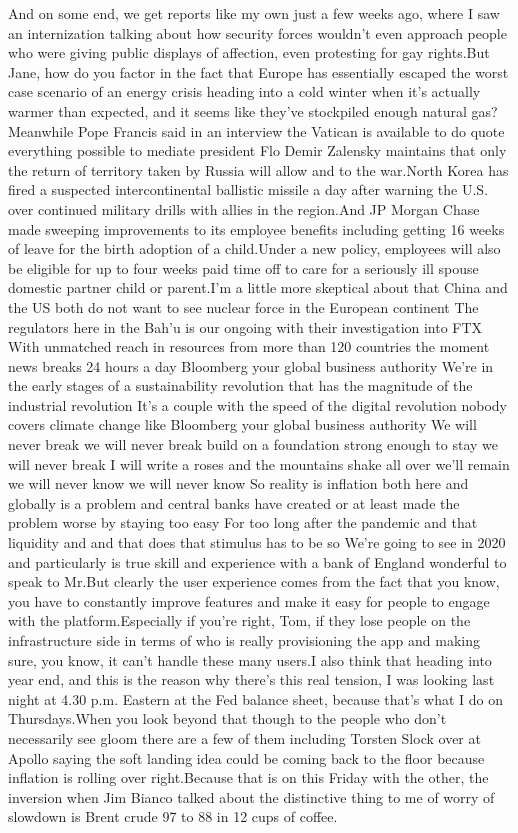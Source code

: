 \documentclass{article}%
\begin{document}
And on some end, we get reports like my own just a few weeks ago, where I saw an internization talking about how security forces wouldn't even approach people who were giving public displays of affection, even protesting for gay rights.But Jane, how do you factor in the fact that Europe has essentially escaped the worst case scenario of an energy crisis heading into a cold winter when it's actually warmer than expected, and it seems like they've stockpiled enough natural gas?Meanwhile Pope Francis said in an interview the Vatican is available to do quote everything possible to mediate president Flo Demir Zalensky maintains that only the return of territory taken by Russia will allow and to the war.North Korea has fired a suspected intercontinental ballistic missile a day after warning the U.S. over continued military drills with allies in the region.And JP Morgan Chase made sweeping improvements to its employee benefits including getting 16 weeks of leave for the birth adoption of a child.Under a new policy, employees will also be eligible for up to four weeks paid time off to care for a seriously ill spouse domestic partner child or parent.I'm a little more skeptical about that China and the US both do not want to see nuclear force in the European continent The regulators here in the Bah'u is our ongoing with their investigation into FTX With unmatched reach in resources from more than 120 countries the moment news breaks 24 hours a day Bloomberg your global business authority We're in the early stages of a sustainability revolution that has the magnitude of the industrial revolution It's a couple with the speed of the digital revolution nobody covers climate change like Bloomberg your global business authority We will never break we will never break build on a foundation strong enough to stay we will never break I will write a roses and the mountains shake all over we'll remain we will never know we will never know So reality is inflation both here and globally is a problem and central banks have created or at least made the problem worse by staying too easy For too long after the pandemic and that liquidity and and that does that stimulus has to be so We're going to see in 2020 and particularly is true skill and experience with a bank of England wonderful to speak to Mr.But clearly the user experience comes from the fact that you know, you have to constantly improve features and make it easy for people to engage with the platform.Especially if you're right, Tom, if they lose people on the infrastructure side in terms of who is really provisioning the app and making sure, you know, it can't handle these many users.I also think that heading into year end, and this is the reason why there's this real tension, I was looking last night at 4.30 p.m. Eastern at the Fed balance sheet, because that's what I do on Thursdays.When you look beyond that though to the people who don't necessarily see gloom there are a few of them including Torsten Slock over at Apollo saying the soft landing idea could be coming back to the floor because inflation is rolling over right.Because that is on this Friday with the other, the inversion when Jim Bianco talked about the distinctive thing to me of worry of slowdown is Brent crude 97 to 88 in 12 cups of coffee.%
\end{document}

